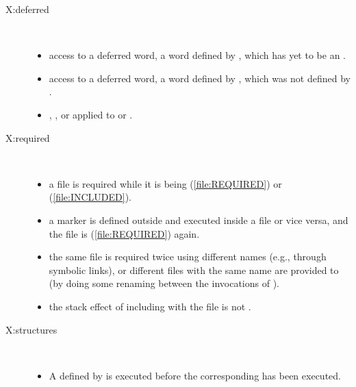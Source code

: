 \begin{description}


\item[\textsf{X:deferred}] ~
	\begin{itemize}
\item access to a deferred word, a word defined by ,
	which has yet to be 
	an .

\item access to a deferred word, a word defined by ,
	which was not defined by .

\item {}, ,
	 or  applied to 
	or .
	\end{itemize}


\item[\textsf{X:required}] ~
	\begin{itemize}
\item a file is required while it is being 
	(\ref{file:REQUIRED}) or  (\ref{file:INCLUDED}).

\item a marker is defined outside and executed inside a file or vice
	versa, and the file is  (\ref{file:REQUIRED})
	again.

\item the same file is required twice using different names (e.g.,
	through symbolic links), or different files with the same name are
	provided to  (by doing some renaming
	between the invocations of ).

\item the stack effect of including with 
	the file is not .
	\end{itemize}


\item[\textsf{X:structures}] ~
	\begin{itemize}
\item A  defined by
	is executed before the corresponding
	has been executed.
	\end{itemize}
\end{description}



